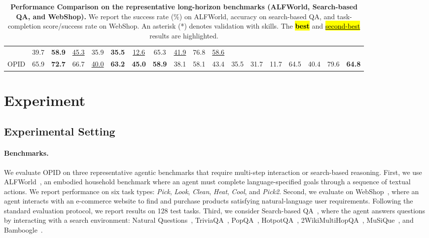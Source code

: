 \documentclass{llmxive}
\begin{document}
\begin{table}[ht!]
{\begin{tabular}{l ccccccc cccccccc cc}
        & 39.7 & \cellcolor{topcolor}\textbf{58.9} & \cellcolor{secondcolor}\underline{45.3} & 35.9 & \cellcolor{topcolor}\textbf{35.5} & \cellcolor{secondcolor}\underline{12.6} & 65.3 & \cellcolor{secondcolor}\underline{41.9}
        & 76.8 & \cellcolor{secondcolor}\underline{58.6}
        \\
    OPID
        & 65.9 & \cellcolor{topcolor}\textbf{72.7} & 66.7 & \cellcolor{secondcolor}\underline{40.0} & \cellcolor{topcolor}\textbf{63.2} & \cellcolor{topcolor}\textbf{45.0} & \cellcolor{topcolor}\textbf{58.9}
        & 38.1 & 58.1 & 43.4 & 35.5 & 31.7 & 11.7 & 64.5 & 40.4
        & 79.6 & \cellcolor{topcolor}\textbf{64.8}
        \\

    \bottomrule
    \end{tabular}
    }
\caption{
        \textbf{Performance Comparison on the representative long-horizon benchmarks (ALFWorld, Search-based QA, and WebShop).}
        We report the success rate (\%) on ALFWorld, accuracy on search-based QA, and task-completion score/success rate on WebShop. An asterisk (*) denotes validation with skills. The \hl{\textbf{best}} and \hl{\mbox{\underline{second-best}}} results are highlighted.
    }
\end{table}


\section{Experiment}
\subsection{Experimental Setting}

\paragraph{Benchmarks.}
We evaluate OPID on three representative agentic benchmarks that require multi-step interaction or search-based reasoning. First, we use ALFWorld~\citep{shridhar2020alfworld}, an embodied household benchmark where an agent must complete language-specified goals through a sequence of textual actions. We report performance on six task types: \textit{Pick}, \textit{Look}, \textit{Clean}, \textit{Heat}, \textit{Cool}, and \textit{Pick2}. Second, we evaluate on WebShop~\citep{yao2022webshop}, where an agent interacts with an e-commerce website to find and purchase products satisfying natural-language user requirements. Following the standard evaluation protocol, we report results on 128 test tasks. Third, we consider Search-based QA~\citep{jin2025searchr1}, where the agent answers questions by interacting with a search environment: Natural Questions~\citep{kwiatkowski2019natural}, TriviaQA~\citep{joshi2017triviaqa}, PopQA~\citep{mallen2023popqa}, HotpotQA~\citep{yang2018hotpotqa}, 2WikiMultiHopQA~\citep{ho2020constructing}, MuSiQue~\citep{trivedi2022musique}, and Bamboogle~\citep{press2023measuring}.
\end{document}
